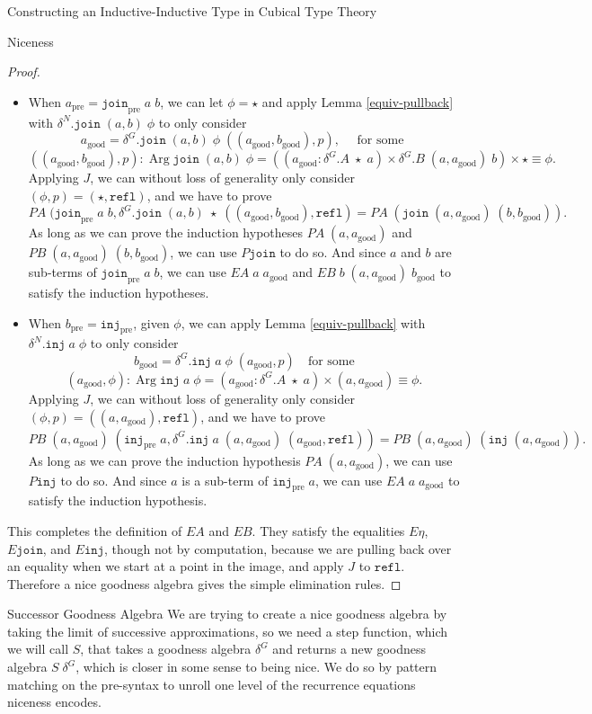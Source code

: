 \documentclass[runningheads]{llncs}
\DeclareMathOperator{\Arg}{Arg}
\newcommand{\pre}[1]{{#1}_\text{pre}}
\newcommand{\good}[1]{{#1}_\text{good}}
\newcommand{\Id}[2]{{#1}\equiv{#2}}
\newcommand{\join}{\texttt{join}}
\newcommand{\inj}{\texttt{inj}}
\newcommand{\refl}{\texttt{refl}}
\begin{document}
\begin{section}{Constructing an Inductive-Inductive Type in Cubical Type Theory}
\begin{subsection}{Niceness}
\begin{proof}
{\begin{itemize}
\item When $\pre{a} = \pre{\join}\;a\;b$, we can let $\phi = \star$ and apply Lemma \ref{equiv-pullback} with $\delta^N.\join\;(a, b)\;\phi$ to only consider \[\good{a} = \delta^G.\join\;(a,b)\;\phi\;((\good{a}, \good{b}), p),\quad\text{ for some }\]\[((\good{a}, \good{b}), p) : \Arg\join\;(a, b)\;\phi = ((\good{a} : \delta^G.A\;\star\;a) \times \delta^G.B\;(a, \good{a})\;b) \times \Id{\star}{\phi}.\] Applying $J$, we can without loss of generality only consider $(\phi, p) = (\star, \refl)$, and we have to prove \[PA\;(\pre{\join}\;a\;b, \delta^G.\join\;(a, b)\;\star\;((\good{a}, \good{b}),\refl) = PA\;(\join\;(a, \good{a})\;(b, \good{b})).\] As long as we can prove the induction hypotheses $PA\;(a, \good{a})$ and $PB\;(a, \good{a})\;(b, \good{b})$, we can use $P\join$ to do so. And since $a$ and $b$ are sub-terms of $\pre{\join}\;a\;b$, we can use $EA\;a\;\good{a}$ and $EB\;b\;(a, \good{a})\;\good{b}$ to satisfy the induction hypotheses.
\item When $\pre{b} = \pre{\inj}$, given $\phi$, we can apply Lemma \ref{equiv-pullback} with $\delta^N.\inj\;a\;\phi$ to only consider \[\good{b} = \delta^G.\inj\;a\;\phi\;(\good{a}, p)\quad\text{for some}\]\[(\good{a}, \phi) : \Arg\inj\;a\;\phi = (\good{a} : \delta^G.A\;\star\;a) \times \Id{(a, \good{a})}{\phi}.\] Applying $J$, we can without loss of generality only consider $(\phi, p) = ((a, \good{a}), \refl)$, and we have to prove \[PB\;(a, \good{a})\;(\pre{\inj}\;a, \delta^G.\inj\;a\;(a, \good{a})\;(\good{a}, \refl)) = PB\;(a, \good{a})\;(\inj\;(a, \good{a})).\] As long as we can prove the induction hypothesis $PA\;(a, \good{a})$, we can use $P\inj$ to do so. And since $a$ is a sub-term of $\pre{\inj}\;a$, we can use $EA\;a\;\good{a}$ to satisfy the induction hypothesis.
\end{itemize}
This completes the definition of $EA$ and $EB$. They satisfy the equalities $E\eta$, $E\join$, and $E\inj$, though not by computation, because we are pulling back over an equality when we start at a point in the image, and apply $J$ to $\refl$. Therefore a nice goodness algebra gives the simple elimination rules.
}

\end{proof}

\end{subsection}

\begin{subsection}{Successor Goodness Algebra}\label{ex-successor-alg}
We are trying to create a nice goodness algebra by taking the limit of successive approximations, so we need a step function, which we will call $S$, that takes a goodness algebra $\delta^G$ and returns a new goodness algebra $S\;\delta^G$, which is closer in some sense to being nice. We do so by pattern matching on the pre-syntax to unroll one level of the recurrence equations niceness encodes.


\end{subsection}
\end{section}
\end{document}
